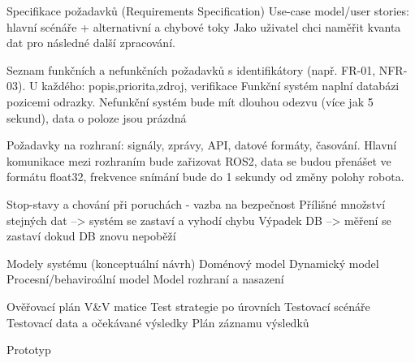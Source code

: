 \sec Specifikace požadavků (Requirements Specification)
\secc Use-case model/user stories: hlavní scénáře + alternativní a chybové toky
Jako uživatel chci naměřit kvanta dat pro následné další zpracování.

\secc Seznam funkčních a nefunkčních požadavků s identifikátory (např. FR-01, NFR-03). U každého: popis,priorita,zdroj, verifikace
Funkční systém naplní databázi pozicemi odrazky.
Nefunkční systém bude mít dlouhou odezvu (více jak 5 sekund), data o poloze jsou prázdná

\secc Požadavky na rozhraní: signály, zprávy, API, datové formáty, časování.
Hlavní komunikace mezi rozhraním bude zařizovat ROS2, data se budou přenášet ve formátu float32, frekvence snímání bude do 1 sekundy od změny polohy robota.


\secc Stop-stavy a chování při poruchách - vazba na bezpečnost
Přílišné množství stejných dat --> systém se zastaví a vyhodí chybu
Výpadek DB --> měření se zastaví dokud DB znovu nepoběží

\sec Modely systému (konceptuální návrh)
\secc Doménový model
\secc Dynamický model
\secc Procesní/behaviroální model
\secc Model rozhraní a nasazení

\sec Ověřovací plán
\secc V&V matice
\secc Test strategie po úrovních
\secc Testovací scénáře
\secc Testovací data a očekávané výsledky
\secc Plán záznamu výsledků

\sec Prototyp
\bye